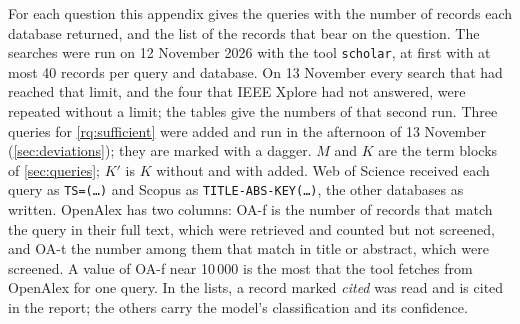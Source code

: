 For each question this appendix gives the queries with the number of
records each database returned, and the list of the records that bear
on the question.
The searches were run on 12 November 2026 with the tool
\texttt{scholar}, at first with at most 40 records per query and
database.
On 13 November every search that had reached that limit, and the four
that IEEE Xplore had not answered, were repeated without a limit; the
tables give the numbers of that second run.
Three queries for \cref{rq:sufficient} were added and run in the
afternoon of 13 November (\cref{sec:deviations}); they are marked with
a dagger.
$M$ and $K$ are the term blocks of \cref{sec:queries}; $K'$ is $K$
without  and with  added.
Web of Science received each query as \texttt{TS=(\dots)} and Scopus as
\texttt{TITLE-ABS-KEY(\dots)}, the other databases as written.
OpenAlex has two columns: OA-f is the number of records that match the
query in their full text, which were retrieved and counted but not
screened, and OA-t the number among them that match in title or
abstract, which were screened.
A value of OA-f near 10\,000 is the most that the tool fetches from
OpenAlex for one query.
In the lists, a record marked \emph{cited} was read and is cited in the
report; the others carry the model's classification and its confidence.

